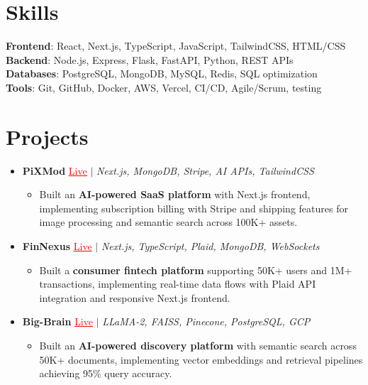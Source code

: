 \documentclass[letterpaper,10pt]{article}
\newcommand{\resumeItem}[1]{\item\small{{#1 \vspace{-2pt}}}}
\newcommand{\resumeProjectHeading}[1]{\item \small #1 \vspace{-2pt}}
\newcommand{\resumeSubHeadingListStart}{\begin{itemize}[leftmargin=0.0in, label={}]}
\newcommand{\resumeSubHeadingListEnd}{\end{itemize}}
\newcommand{\resumeProjItemListStart}{\begin{itemize}[leftmargin=0.15in,label=\textbullet,itemsep=0pt,topsep=0pt,parsep=0pt,partopsep=0pt]}
\newcommand{\resumeProjItemListEnd}{\end{itemize}\vspace{-4pt}}
\begin{document}
\section{Skills}
\begin{itemize}[leftmargin=0.15in, label={}]
\small{\item{
\textbf{Frontend}: React, Next.js, TypeScript, JavaScript, TailwindCSS, HTML/CSS \\
\textbf{Backend}: Node.js, Express, Flask, FastAPI, Python, REST APIs \\
\textbf{Databases}: PostgreSQL, MongoDB, MySQL, Redis, SQL optimization \\
\textbf{Tools}: Git, GitHub, Docker, AWS, Vercel, CI/CD, Agile/Scrum, testing
}}
\end{itemize}
\vspace{-16pt}
\section{Projects}
\resumeSubHeadingListStart
\vspace{-2pt}
\resumeProjectHeading{\textbf{PiXMod} {\href{https://pixmod.vercel.app/}{\textcolor{red}{\underline{Live}}}} $|$ \emph{Next.js, MongoDB, Stripe, AI APIs, TailwindCSS}}
\resumeProjItemListStart
\resumeItem{Built an \textbf{AI-powered SaaS platform} with Next.js frontend, implementing subscription billing with Stripe and shipping features for image processing and semantic search across 100K+ assets.}
\resumeProjItemListEnd
\vspace{3pt}
\resumeProjectHeading{\textbf{FinNexus} {\href{https://fin-nexus.vercel.app/}{\textcolor{red}{\underline{Live}}}} $|$ \emph{Next.js, TypeScript, Plaid, MongoDB, WebSockets}}
\resumeProjItemListStart
\resumeItem{Built a \textbf{consumer fintech platform} supporting 50K+ users and 1M+ transactions, implementing real-time data flows with Plaid API integration and responsive Next.js frontend.}
\resumeProjItemListEnd
\vspace{3pt}
\resumeProjectHeading{\textbf{Big-Brain} {\href{https://big-brain-pied.vercel.app/}{\textcolor{red}{\underline{Live}}}} $|$ \emph{LLaMA-2, FAISS, Pinecone, PostgreSQL, GCP}}
\resumeProjItemListStart
\resumeItem{Built an \textbf{AI-powered discovery platform} with semantic search across 50K+ documents, implementing vector embeddings and retrieval pipelines achieving 95\% query accuracy.}
\resumeProjItemListEnd
\resumeSubHeadingListEnd
\end{document}
